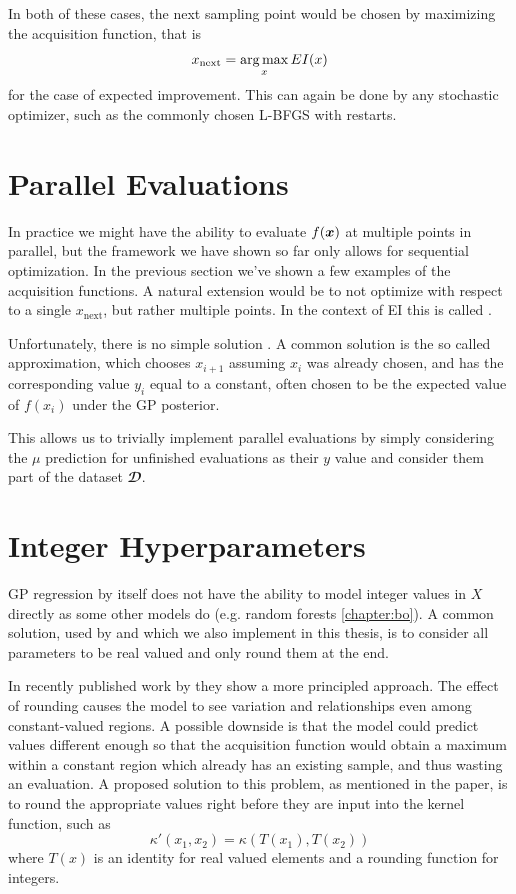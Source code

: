In both of these cases, the next sampling point would be chosen by maximizing
the acquisition function, that is $$x_{\operatorname{next}} = \operatorname*{arg\,max}_x EI(x)$$ for
the case of expected improvement. This can again be done by any stochastic optimizer,
such as the commonly chosen L-BFGS with restarts.


\section{Parallel Evaluations}
\label{section:parallel-evaluations}

In practice we might have the ability to evaluate $f({\boldsymbol{x}})$ at multiple points
in parallel, but the framework we have shown so far only allows for sequential
optimization. In the previous section we've shown a few examples of the
acquisition functions. A natural extension would be to not optimize with respect
to a single $x_{\operatorname{next}}$, but rather multiple points. In the context of
EI this is called .

Unfortunately, there is no simple solution \citep{frazier2018tutorial}. A
common solution is the so called  approximation, which
chooses $x_{i+1}$ assuming $x_i$ was already chosen, and has the corresponding
value $y_i$ equal to a constant, often chosen to be the expected value of
$f(x_i)$ under the GP posterior.

This allows us to trivially implement parallel evaluations by simply
considering the $μ$ prediction for unfinished evaluations as their $y$ value
and consider them part of the dataset $𝓓$.


\section{Integer Hyperparameters}

GP regression by itself does not have the ability to model integer values in $X$ directly as some other models do (e.g. random forests \autoref{chapter:bo}). A common solution, used by \citep{spearmint} and which we also implement in this thesis, is to consider all parameters to be real valued and only round them at the end.

In recently published work by \cite{integer-valued-gp} they show a more principled approach. The effect of rounding causes the model to see variation and relationships even among constant-valued regions. A possible downside is that the model could predict values different enough so that the acquisition function would obtain a maximum within a constant region which already has an existing sample, and thus wasting an evaluation. A proposed solution to this problem, as mentioned in the paper, is to round the appropriate values right before they are input into the kernel function, such as
$$\kappa'(x_1, x_2) = \kappa(T(x_1), T(x_2))$$ where $T(x)$ is an identity for real valued elements and a rounding function for integers.

